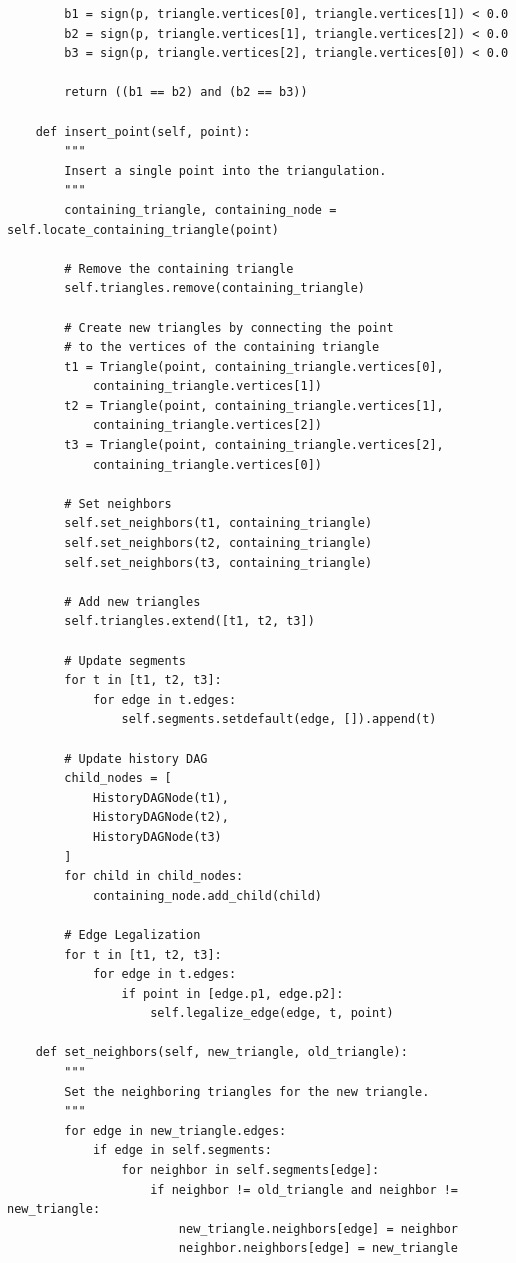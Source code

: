 \documentclass{article}
\begin{document}
\begin{verbatim}
        b1 = sign(p, triangle.vertices[0], triangle.vertices[1]) < 0.0
        b2 = sign(p, triangle.vertices[1], triangle.vertices[2]) < 0.0
        b3 = sign(p, triangle.vertices[2], triangle.vertices[0]) < 0.0

        return ((b1 == b2) and (b2 == b3))

    def insert_point(self, point):
        """
        Insert a single point into the triangulation.
        """
        containing_triangle, containing_node = self.locate_containing_triangle(point)

        # Remove the containing triangle
        self.triangles.remove(containing_triangle)

        # Create new triangles by connecting the point 
        # to the vertices of the containing triangle
        t1 = Triangle(point, containing_triangle.vertices[0], 
            containing_triangle.vertices[1])
        t2 = Triangle(point, containing_triangle.vertices[1], 
            containing_triangle.vertices[2])
        t3 = Triangle(point, containing_triangle.vertices[2], 
            containing_triangle.vertices[0])

        # Set neighbors
        self.set_neighbors(t1, containing_triangle)
        self.set_neighbors(t2, containing_triangle)
        self.set_neighbors(t3, containing_triangle)

        # Add new triangles
        self.triangles.extend([t1, t2, t3])

        # Update segments
        for t in [t1, t2, t3]:
            for edge in t.edges:
                self.segments.setdefault(edge, []).append(t)

        # Update history DAG
        child_nodes = [
            HistoryDAGNode(t1),
            HistoryDAGNode(t2),
            HistoryDAGNode(t3)
        ]
        for child in child_nodes:
            containing_node.add_child(child)

        # Edge Legalization
        for t in [t1, t2, t3]:
            for edge in t.edges:
                if point in [edge.p1, edge.p2]:
                    self.legalize_edge(edge, t, point)

    def set_neighbors(self, new_triangle, old_triangle):
        """
        Set the neighboring triangles for the new triangle.
        """
        for edge in new_triangle.edges:
            if edge in self.segments:
                for neighbor in self.segments[edge]:
                    if neighbor != old_triangle and neighbor != new_triangle:
                        new_triangle.neighbors[edge] = neighbor
                        neighbor.neighbors[edge] = new_triangle


\end{verbatim}
\end{document}
